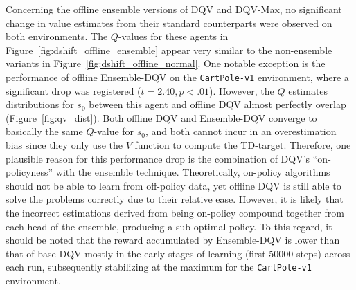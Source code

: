 Concerning the offline ensemble versions of DQV and DQV-Max, no
significant change in value estimates from their standard counterparts
were observed on both environments. The $Q$-values for these agents in
Figure~\ref{fig:dshift_offline_ensemble} appear very similar to the
non-ensemble variants in Figure~\ref{fig:dshift_offline_normal}. One
notable exception is the performance of offline Ensemble-DQV on the
\texttt{CartPole-v1} environment, where a significant drop was
registered ($t=2.40,p<.01$). However, the $Q$ estimates distributions
for $s_0$ between this agent and offline DQV almost perfectly
overlap (Figure~\ref{fig:qv_dist}). Both offline
DQV and Ensemble-DQV converge to basically the same $Q$-value for
$s_0$, and both cannot incur in an overestimation bias since they only
use the $V$ function to compute the TD-target. Therefore, one
plausible reason for this performance drop is the combination of DQV's
``on-policyness'' with the ensemble technique. Theoretically,
on-policy algorithms should not be able to learn from off-policy data,
yet offline DQV is still able to solve the problems correctly due to
their relative ease. However, it is likely that the incorrect
estimations derived from being on-policy compound together from each
head of the ensemble, producing a sub-optimal policy. To this regard,
it should be noted that the reward accumulated by Ensemble-DQV is
lower than that of base DQV mostly in the early stages of learning
(first 50000 steps) across each run, subsequently stabilizing at the
maximum for the \texttt{CartPole-v1} environment.

